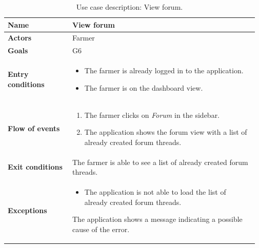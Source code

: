 \begin{table}[H]
    \centering
	\begin{tabular}{@{}p{0.25\linewidth} p{0.72\linewidth}@{}}
        \toprule
		\textbf{Name}               & View forum\\
		\midrule
		\textbf{Actors}             & Farmer\\
		\midrule
		\textbf{Goals}              & G6 \\
		\midrule
		
		\textbf{Entry conditions}   & \begin{itemize}[leftmargin=.4cm,noitemsep,topsep=0pt,before=\vspace{-3mm},after=\vspace{-4mm}]
		    \item The farmer is already logged in to the application.
		    \item The farmer is on the dashboard view.
		\end{itemize}\\
		\midrule
		
		\textbf{Flow of events}     & \begin{enumerate}[leftmargin=.4cm,noitemsep,topsep=0pt,before=\vspace{-3mm},after=\vspace{-4mm}]
		    \item The farmer clicks on \textit{Forum} in the sidebar.
		    \item The application shows the forum view with a list of already created forum threads.
		\end{enumerate}\\
		\midrule
		\textbf{Exit conditions}    & The farmer is able to see a list of already created forum threads. \\
		\midrule
		
		\textbf{Exceptions}         & 
	    \begin{itemize}[leftmargin=.4cm,noitemsep,topsep=0pt,before=\vspace{-3mm}]
		   \item The application is not able to load the list of already created forum threads.
		\end{itemize}
		The application shows a message indicating a possible cause of the error.
		\\\bottomrule
	\end{tabular}
	\caption{Use case description: View forum.} 
\end{table}


